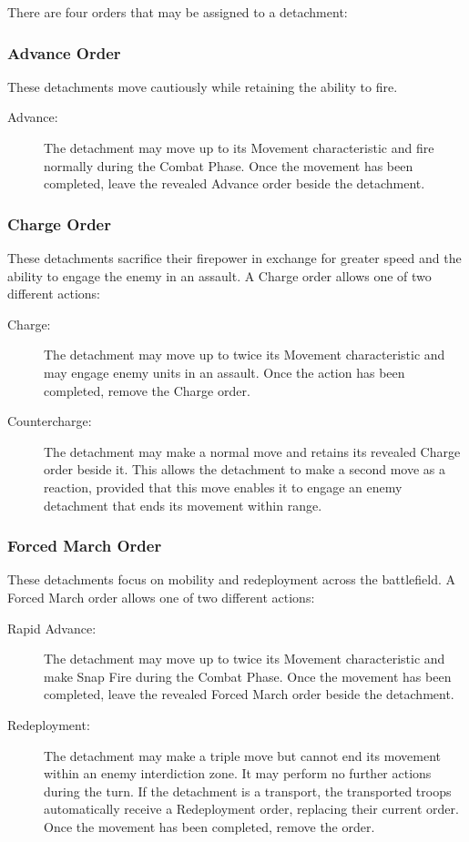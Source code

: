 There are four orders that may be assigned to a detachment:

\subsubsection{Advance Order}

These detachments move cautiously while retaining the ability to fire.

\begin{description}
    \item[Advance:] The detachment may move up to its Movement characteristic and fire normally during the Combat Phase. Once the movement has been completed, leave the revealed Advance order beside the detachment.
\end{description}

\subsubsection{Charge Order}

These detachments sacrifice their firepower in exchange for greater speed and the ability to engage the enemy in an assault. A Charge order allows one of two different actions:

\begin{description}
    \item[Charge:] The detachment may move up to twice its Movement characteristic and may engage enemy units in an assault. Once the action has been completed, remove the Charge order.

    \item[Countercharge:] The detachment may make a normal move and retains its revealed Charge order beside it. This allows the detachment to make a second move as a reaction, provided that this move enables it to engage an enemy detachment that ends its movement within range.
\end{description}

\subsubsection{Forced March Order}

These detachments focus on mobility and redeployment across the battlefield. A Forced March order allows one of two different actions:

\begin{description}
    \item[Rapid Advance:] The detachment may move up to twice its Movement characteristic and make Snap Fire during the Combat Phase. Once the movement has been completed, leave the revealed Forced March order beside the detachment.

    \item[Redeployment:] The detachment may make a triple move but cannot end its movement within an enemy interdiction zone. It may perform no further actions during the turn. If the detachment is a transport, the transported troops automatically receive a Redeployment order, replacing their current order. Once the movement has been completed, remove the order.
\end{description}

